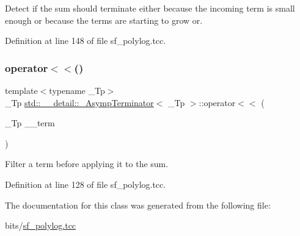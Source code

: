 Detect if the sum should terminate either because the incoming term is small enough or because the terms are starting to grow or. 



Definition at line 148 of file sf\+\_\+polylog.\+tcc.

\mbox{\label{classstd_1_1____detail_1_1__AsympTerminator_a7299b3abc814127eba98d16f6ac7d4e1}} 
\subsubsection{\texorpdfstring{operator$<$$<$()}{operator<<()}}
{\footnotesize\ttfamily template$<$typename \+\_\+\+Tp$>$ \\
\+\_\+\+Tp \hyperlink{classstd_1_1____detail_1_1__AsympTerminator}{std\+::\+\_\+\+\_\+detail\+::\+\_\+\+Asymp\+Terminator}$<$ \+\_\+\+Tp $>$\+::operator$<$$<$ (\begin{DoxyParamCaption}\item[{\+\_\+\+Tp}]{\+\_\+\+\_\+term }\end{DoxyParamCaption})\hspace{0.3cm}{\ttfamily [inline]}}



Filter a term before applying it to the sum. 



Definition at line 128 of file sf\+\_\+polylog.\+tcc.



The documentation for this class was generated from the following file\+:\begin{DoxyCompactItemize}
\item 
bits/\hyperlink{sf__polylog_8tcc}{sf\+\_\+polylog.\+tcc}\end{DoxyCompactItemize}
